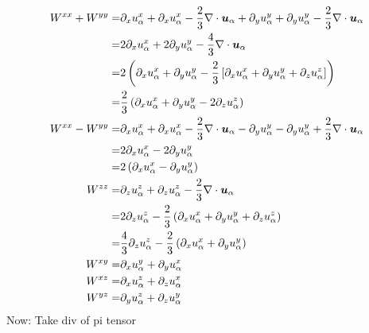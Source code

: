\begin{align*}
W^{xx} + W^{yy}
=&
\partial_x u^{x}_{\a}
+ \partial_x u^{x}_{\a}
- \frac{2}{3} \div \ve{u}_{\a}
+ \partial_y u^{y}_{\a}
+ \partial_y u^{y}_{\a}
- \frac{2}{3} \div \ve{u}_{\a}
\\
=&
2\partial_x u^{x}_{\a}
+ 2\partial_y u^{y}_{\a}
- \frac{4}{3} \div \ve{u}_{\a}
\\
=&
2\L(\partial_x u^{x}_{\a}
    + \partial_y u^{y}_{\a}
    - \frac{2}{3} \L[\partial_x u^{x}_{\a}
          +\partial_y u^{y}_{\a}
          +\partial_z u^{z}_{\a}
                      \R] \R)
\\
=&
\frac{2}{3}\L(\partial_x u^{x}_{\a}
          + \partial_y u^{y}_{\a}
          - 2\partial_z u^{z}_{\a} \R)
\\
%
%
%
W^{xx} - W^{yy}
=&
\partial_x u^{x}_{\a}
+ \partial_x u^{x}_{\a}
- \frac{2}{3} \div \ve{u}_{\a}
- \partial_y u^{y}_{\a}
- \partial_y u^{y}_{\a}
+ \frac{2}{3} \div \ve{u}_{\a}
\\
=&
2\partial_x u^{x}_{\a} -2 \partial_y u^{y}_{\a}
\\
=&
2\L(\partial_x u^{x}_{\a} - \partial_y u^{y}_{\a} \R)
\\
%
%
%
W^{zz}
=&
\partial_z u^{z}_{\a} + \partial_z u^{z}_{\a} - \frac{2}{3} \div \ve{u}_{\a}
\\
%
=&
2\partial_z u^{z}_{\a} - \frac{2}{3}
    \L(\partial_x u^{x}_{\a}
       +\partial_y u^{y}_{\a}
       +\partial_z u^{z}_{\a}
    \R)
\\
%
=&
\frac{4}{3} \partial_z u^{z}_{\a} - \frac{2}{3}
    \L(\partial_x u^{x}_{\a}
       +\partial_y u^{y}_{\a}
    \R)
\\
%
%
%
%
W^{xy}
=&
\partial_x u^{y}_{\a} + \partial_y u^{x}_{\a}
\\
%
%
%
%
W^{xz}
=&
\partial_x u^{z}_{\a} + \partial_z u^{x}_{\a}
\\
%
%
%
W^{yz}
=&
\partial_y u^{z}_{\a} + \partial_z u^{y}_{\a}
%
\end{align*}
%
Now: Take div of pi tensor
%
